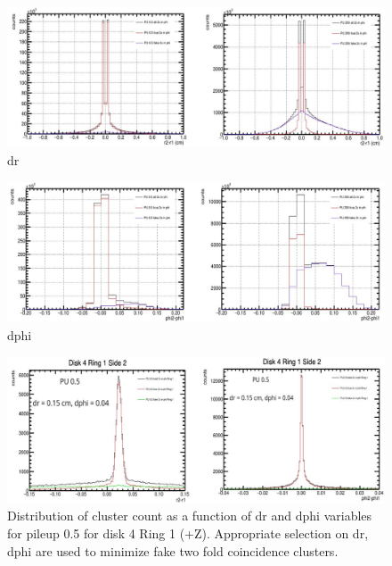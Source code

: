 \begin{figure}[!htp]
\centering
\includegraphics[width=1\textwidth]{ashish_thesis/delta_r.png}
\caption{%
  dr
}
\label{fig:dr}
\end{figure}


\begin{figure}[!htp]
\centering
\includegraphics[width=1\textwidth]{ashish_thesis/dphi.png}
\caption{%
 dphi 
}
\label{fig:dphi}
\end{figure}


\begin{figure}[!htp]
\centering
\includegraphics[width=1\textwidth]{ashish_thesis/D4R1_S2_drdphi_cut.png}
\caption{%
  Distribution of cluster count as a function of dr and dphi variables for pileup 0.5 for disk 4 Ring 1 (+Z). Appropriate selection on dr, dphi are used to minimize fake two fold coincidence clusters.
}
\label{fig:cluster_dr_dphi_dist}
\end{figure}



